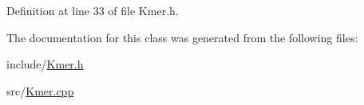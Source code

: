 Definition at line 33 of file Kmer.\+h.



The documentation for this class was generated from the following files\+:\begin{DoxyCompactItemize}
\item 
include/\hyperlink{Kmer_8h}{Kmer.\+h}\item 
src/\hyperlink{Kmer_8cpp}{Kmer.\+cpp}\end{DoxyCompactItemize}
